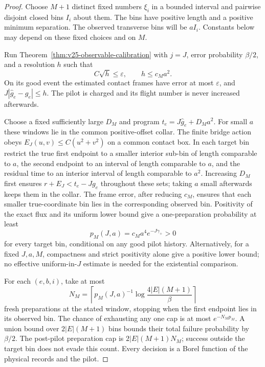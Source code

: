 \begin{proof}
Choose \(M+1\) distinct fixed numbers \(\xi_i\) in a bounded interval and
pairwise disjoint closed bins \(I_i\) about them.  The bins have positive
length and a positive minimum separation.  The observed transverse bins
will be \(aI_i\).  Constants below may depend on these fixed choices and
on \(M\).

Run Theorem~\ref{thm:v25-observable-calibration} with \(j=J\), error
probability \(\beta/2\), and a resolution \(h\) such that
\[
 C\sqrt h\le\varepsilon,\qquad h\le c_Ma^2.
\]
On its good event the estimated contact frames have error at most
\(\varepsilon\), and \(J|\widehat g_e-g_e|\le h\).
The pilot is charged and its flight number is never increased afterwards.

Choose a fixed sufficiently large \(D_M\) and program
\(t_e=J\widehat g_e+D_Ma^2\).  For small \(a\) these windows lie in the
common positive-offset collar.  The finite bridge action obeys
\(E_J(u,v)\le C(u^2+v^2)\) on a common contact box.  In each target bin
restrict the true first endpoint to a smaller interior sub-bin of length
comparable to \(a\), the second endpoint to an interval of length comparable
to \(a\), and the residual time to an interior interval of length comparable
to \(a^2\).  Increasing \(D_M\) first ensures
\(r+E_J<t_e-Jg_e\) throughout these sets; taking \(a\) small afterwards
keeps them in the collar.  The frame error, after reducing \(c_M\), ensures
that each smaller true-coordinate bin lies in the corresponding observed
bin.  Positivity of the exact flux and its uniform lower bound give a
one-preparation probability at least
\begin{equation}\label{eq:v26-bin-probability}
                      p_M(J,a)=c_Ma^4e^{-J\gamma_+}>0
\end{equation}
for every target bin, conditional on any good pilot history.  Alternatively,
for a fixed \(J,a,M\), compactness and strict positivity alone give a
positive lower bound; no effective uniform-in-\(J\) estimate is needed for
the existential comparison.

For each \((e,b,i)\), take at most
\[
 N_M=\left\lceil p_M(J,a)^{-1}
             \log\frac{4|E|(M+1)}\beta\right\rceil
\]
fresh preparations at the stated window, stopping when the first endpoint
lies in its observed bin.  The chance of exhausting any one cap is at most
\(e^{-N_Mp_M}\).  A union bound over \(2|E|(M+1)\) bins bounds their total
failure probability by \(\beta/2\).  The post-pilot preparation cap is
\(2|E|(M+1)N_M\); success outside the target bin does not evade this count.
Every decision is a Borel function of the physical records and the pilot.


\end{proof}
